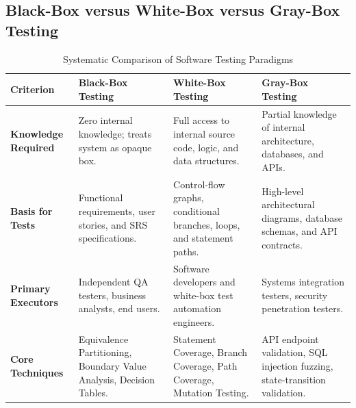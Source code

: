 \subsection{Black-Box versus White-Box versus Gray-Box Testing}
\begin{table}[htbp]
\centering
\small
\caption{Systematic Comparison of Software Testing Paradigms}
\label{tab:testing_paradigms}
\begin{tabularx}{\textwidth}{l p{3.8cm} p{3.8cm} X}
\toprule
\textbf{Criterion} & \textbf{Black-Box Testing} & \textbf{White-Box Testing} & \textbf{Gray-Box Testing} \\
\midrule
\textbf{Knowledge Required} & Zero internal knowledge; treats system as opaque box. & Full access to internal source code, logic, and data structures. & Partial knowledge of internal architecture, databases, and APIs. \\
\textbf{Basis for Tests} & Functional requirements, user stories, and SRS specifications. & Control-flow graphs, conditional branches, loops, and statement paths. & High-level architectural diagrams, database schemas, and API contracts. \\
\textbf{Primary Executors} & Independent QA testers, business analysts, end users. & Software developers and white-box test automation engineers. & Systems integration testers, security penetration testers. \\
\textbf{Core Techniques} & Equivalence Partitioning, Boundary Value Analysis, Decision Tables. & Statement Coverage, Branch Coverage, Path Coverage, Mutation Testing. & API endpoint validation, SQL injection fuzzing, state-transition validation. \\
\bottomrule
\end{tabularx}
\end{table}

